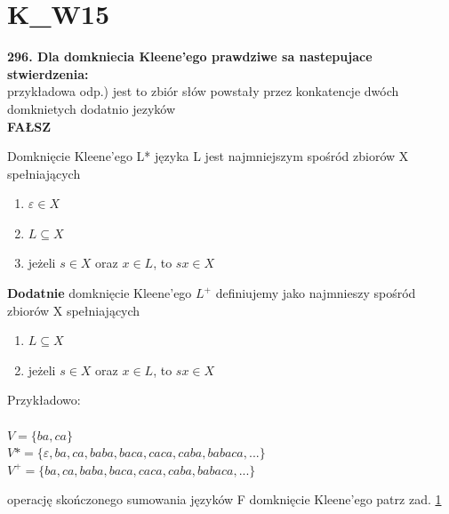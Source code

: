 \section{K\_W15}\label{296}
\textbf{296. Dla domkniecia Kleene’ego prawdziwe sa nastepujace stwierdzenia:}\\
przykładowa odp.) jest to zbiór słów powstały przez konkatencje dwóch domknietych dodatnio jezyków\\
\textbf{FAŁSZ}

Domknięcie Kleene'ego L* języka L jest najmniejszym spośród zbiorów X spełniających\\
\begin{enumerate}
	\item $\varepsilon \in X$
	\item $L \subseteq X$
	\item jeżeli $s \in X$ oraz $x \in L$, to $sx \in X $
\end{enumerate}

\textbf{Dodatnie} domknięcie Kleene'ego $L^+$ definiujemy jako najmnieszy spośród zbiorów X spełniających\\
\begin{enumerate}
	\item $L \subseteq X$
	\item jeżeli $s \in X$ oraz $x \in L$, to $sx \in X $
\end{enumerate}

Przykładowo:\\\\
$V = \{ba, ca\}$\\
$V* = \{\varepsilon, ba, ca, baba, baca, caca, caba, babaca, ...\}$\\
$V^+ = \{ba, ca, baba, baca, caca, caba, babaca, ...\}$

{operację skończonego sumowania języków}
{F}
{domknięcie Kleene'ego}
{patrz zad. \ref{296}}


